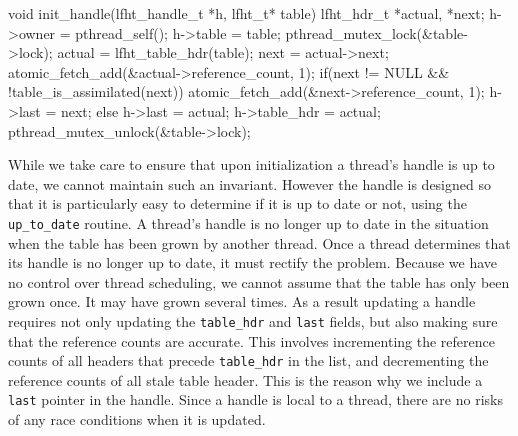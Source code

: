 \begin{center}
\begin{clisting}
void init_handle(lfht_handle_t *h, lfht_t* table){
  lfht_hdr_t *actual, *next;
  h->owner = pthread_self();
  h->table = table;
  pthread_mutex_lock(&table->lock);
  actual = lfht_table_hdr(table);
  next = actual->next;
  atomic_fetch_add(&actual->reference_count, 1);
  if(next != NULL && !table_is_assimilated(next)){
    atomic_fetch_add(&next->reference_count, 1);
    h->last = next;
  } else {
    h->last = actual;
  }
  h->table_hdr = actual;
  pthread_mutex_unlock(&table->lock);
}
\end{clisting}
\end{center}

While we take care to ensure that upon initialization a thread's
handle is up to date, we cannot maintain such an invariant. However
the handle is designed so that it is particularly easy to determine if
it is up to date or not, using the \texttt{up\_to\_date} routine.  A
thread's handle is no longer up to date in the situation when the
table has been grown by another thread.  Once a thread determines that
its handle is no longer up to date, it must rectify the problem. 
Because we have no control over thread scheduling, we cannot 
assume that the table has only been grown once. It may have grown several times.
As a result updating a handle requires not only updating the
\texttt{table\_hdr} and \texttt{last} fields, but also making sure
that the reference counts are accurate. This involves incrementing the
reference counts of all headers that precede \texttt{table\_hdr} in
the list, and decrementing the reference counts of all stale table
header.  This is the reason why we include a \texttt{last} pointer in the handle.
Since a handle is local to a thread, there are no risks of any race
conditions when it is updated.

